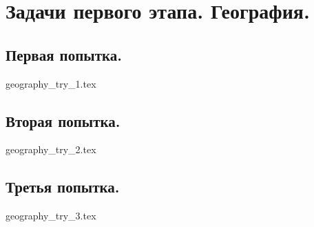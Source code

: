\chapter{Задачи первого этапа. География.}

\section{Первая попытка.}

{geography_try_1.tex}

\section{Вторая попытка.}

{geography_try_2.tex}

\section{Третья попытка.}

{geography_try_3.tex}

